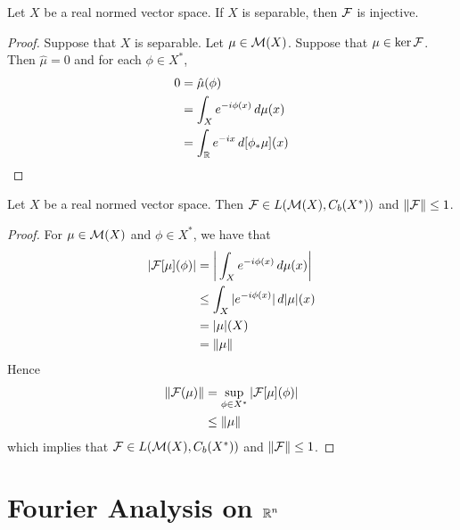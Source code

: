 \documentclass{book}
\begin{document}
	\begin{ex}
		Let $X$ be a real normed vector space. If $X$ is separable, then $\mathcal{F}$ is injective.  
	\end{ex}
	
	\begin{proof}
		Suppose that $X$ is separable. Let $\mu \in \mathcal{M}(X)$. Suppose that $\mu \in \ker \mathcal{F}$. Then $\hat{\mu} =0$ and for each $\phi \in X^*$, 
		\begin{align*}
			0 
			& = \hat{\mu}(\phi) \\
			& = \int_X e^{-i \phi(x)} \, d \mu(x) \\
			& = \int_{\mathbb{R}} e^{-ix} \, d[\phi_*\mu](x)
		\end{align*}
	\end{proof}
	
	\begin{ex}
		Let $X$ be a real normed vector space. Then $\mathcal{F} \in L(\mathcal{M}(X), C_b(X^*))$ and $\|\mathcal{F}\| \leq 1$.
	\end{ex}
	
	\begin{proof}
		For $\mu \in \mathcal{M}(X)$ and $\phi \in X^*$, we have that 
		\begin{align*}
			|\mathcal{F}[\mu](\phi)|
			& =  \bigg| \int_X e^{-i \phi(x)} \, d \mu(x) \bigg| \\
			& \leq \int_X |e^{-i \phi(x)}| \, d|\mu|(x) \\
			& = |\mu|(X) \\
			& = \|\mu\|
		\end{align*}
		Hence 
		\begin{align*}
			\|\mathcal{F}(\mu)\| 
			& = \sup_{\phi \in X^*} |\mathcal{F}[\mu](\phi)| \\
			& \leq \|\mu\|
		\end{align*}
		which implies that $\mathcal{F} \in L(\mathcal{M}(X), C_b(X^*))$ and $\|\mathcal{F}\| \leq 1$.
	\end{proof}
	
	
	
	
	
	
	
	
	
	
	
	
	
	
	
	
	
	
	
	
	
	\newpage
	\chapter{Fourier Analysis on $\mathbb{R}^n$}	
\end{document}
